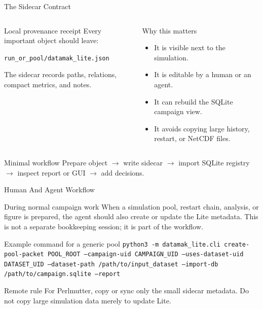 \documentclass[aspectratio=169,11pt]{beamer}
\newcommand{\code}[1]{\texttt{#1}}
\begin{document}
\begin{frame}{The Sidecar Contract}
  \begin{columns}[T]
    \begin{block}{Local provenance receipt}
      \small
      Every important object should leave:
      \begin{center}
        \code{run\_or\_pool/datamak\_lite.json}
      \end{center}
      The sidecar records paths, relations, compact metrics, and notes.
    \end{block}

    \begin{block}{Why this matters}
      \small
      \begin{itemize}
        \item It is visible next to the simulation.
        \item It is editable by a human or an agent.
        \item It can rebuild the SQLite campaign view.
        \item It avoids copying large history, restart, or NetCDF files.
      \end{itemize}
    \end{block}
  \end{columns}

  \begin{block}{Minimal workflow}
    \small
    Prepare object $\rightarrow$ write sidecar $\rightarrow$ import SQLite
    registry $\rightarrow$ inspect report or GUI $\rightarrow$ add decisions.
  \end{block}
\end{frame}

\begin{frame}{Human And Agent Workflow}
  \begin{block}{During normal campaign work}
    \small
    When a simulation pool, restart chain, analysis, or figure is prepared, the
    agent should also create or update the Lite metadata.  This is not a
    separate bookkeeping session; it is part of the workflow.
  \end{block}

  \begin{block}{Example command for a generic pool}
    \scriptsize
    \code{python3 -m datamak\_lite.cli create-pool-packet POOL\_ROOT
    --campaign-uid CAMPAIGN\_UID
    --uses-dataset-uid DATASET\_UID
    --dataset-path /path/to/input\_dataset
    --import-db /path/to/campaign.sqlite
    --report}
  \end{block}

  \begin{block}{Remote rule}
    \small
    For Perlmutter, copy or sync only the small sidecar metadata.  Do not copy
    large simulation data merely to update Lite.
  \end{block}
\end{frame}
\end{document}
